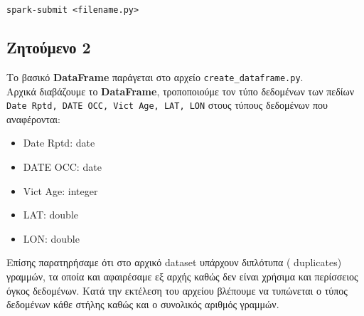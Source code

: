 \documentclass{article}
\begin{document}
\begin{center}
\texttt{spark-submit <filename.py>}
\end{center}

\subsection*{Ζητούμενο 2}
\label{subsec:Z2}
Το βασικό  \textbf{DataFrame}  παράγεται στο αρχείο  \texttt{create\_dataframe.py}.\\
 Αρχικά διαβάζουμε το  \textbf{DataFrame}, τροποποιούμε τον τύπο δεδομένων των πεδίων  \texttt{Date Rptd, DATE OCC, Vict Age, LAT, LON}  στους τύπους δεδομένων που αναφέρονται:
\begin{itemize}
    \item   Date Rptd: date
    \item   DATE OCC:  date
    \item   Vict Age:  integer
    \item   LAT:       double
    \item   LON:       double
\end{itemize}
Επίσης παρατηρήσαμε ότι στο αρχικό dataset  υπάρχουν διπλότυπα ( duplicates)  γραμμών, τα οποία και αφαιρέσαμε εξ αρχής καθώς δεν είναι χρήσιμα και περίσσειος όγκος δεδομένων. Κατά την εκτέλεση του αρχείου βλέπουμε να τυπώνεται ο τύπος δεδομένων κάθε στήλης καθώς και ο συνολικός αριθμός γραμμών.
\end{document}
